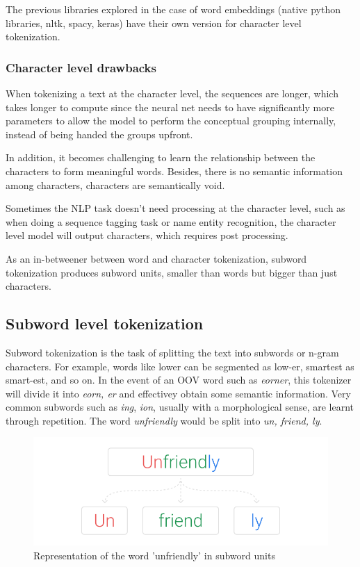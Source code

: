 The previous libraries explored in the case of word embeddings (native python libraries, nltk, spacy, keras) have their own version for character level tokenization.

\subsubsection{Character level drawbacks}

When tokenizing a text at the character level, the sequences are longer, which takes longer to compute since the neural net needs to have significantly more parameters to allow the model to perform the conceptual grouping internally, instead of being handed the groups upfront.

In addition, it becomes challenging to learn the relationship between the characters to form meaningful words. Besides, there is no semantic information among characters, characters are semantically void.

Sometimes the NLP task doesn't need processing at the character level, such as when doing a sequence tagging task or name entity recognition, the character level model will output characters, which requires post processing.

As an in-betweener between word and character tokenization, subword tokenization produces subword units, smaller than words but bigger than just characters.

\subsection{Subword level tokenization}

Subword tokenization is the task of splitting the text into subwords or n-gram characters. For example, words like lower can be segmented as low-er, smartest as smart-est, and so on. In the event of an OOV word such as \emph{eorner}, this tokenizer will divide it into \emph{eorn, er} and effectivey obtain some semantic information. Very common subwords such as \emph{ing}, \emph{ion}, usually with a morphological sense, are learnt through repetition. The word \emph{unfriendly} would be split into \emph{un, friend, ly}.

\begin{figure}[!ht]
    \centering
    \includegraphics[width=12cm]{figures/subword.png}
    \caption{Representation of the word 'unfriendly' in subword units}
\end{figure}

